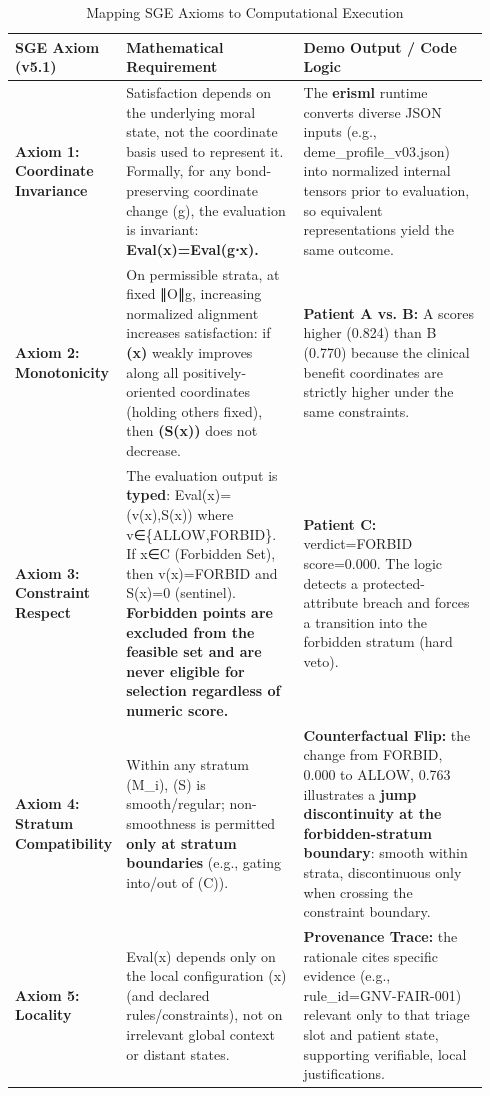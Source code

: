 \documentclass[12pt]{article}
\theoremstyle{plain}
\theoremstyle{definition}
\theoremstyle{remark}
\begin{document}
\begin{table}[t]
\centering
\caption{Mapping SGE Axioms to Computational Execution}
\begin{tabular}{p{0.13\linewidth} p{0.39\linewidth} p{0.42\linewidth}}
\toprule
\textbf{SGE Axiom (v5.1)} & \textbf{Mathematical Requirement} & \textbf{Demo Output / Code Logic} \\
\midrule
\textbf{Axiom 1: Coordinate Invariance} & Satisfaction depends on the
underlying moral state, not the coordinate basis used to represent it.
Formally, for any bond-preserving coordinate change (g), the evaluation
is invariant: \textbf{Eval(x)=Eval(g⋅x).} & The \textbf{erisml} runtime
converts diverse JSON inputs (e.g., deme\_profile\_v03.json) into
normalized internal tensors prior to evaluation, so equivalent
representations yield the same outcome. \\
\textbf{Axiom 2: Monotonicity} & On permissible strata, at fixed ∥O∥g,
increasing normalized alignment increases satisfaction: if \textbf{(x)}
weakly improves along all positively-oriented coordinates (holding
others fixed), then \textbf{(S(x))} does not decrease. & \textbf{Patient
A vs. B:} A scores higher (0.824) than B (0.770) because the clinical
benefit coordinates are strictly higher under the same constraints. \\
\textbf{Axiom 3: Constraint Respect} & The evaluation output is
\textbf{typed}: Eval(x)=(v(x),S(x)) where v∈\{ALLOW,FORBID\}. If x∈C
(Forbidden Set), then v(x)=FORBID and S(x)=0 (sentinel).
\textbf{Forbidden points are excluded from the feasible set and are
never eligible for selection regardless of numeric score.} &
\textbf{Patient C:} verdict=FORBID score=0.000. The logic detects a
protected-attribute breach and forces a transition into the forbidden
stratum (hard veto). \\
\textbf{Axiom 4: Stratum Compatibility} & Within any stratum (M\_i), (S)
is smooth/regular; non-smoothness is permitted \textbf{only at stratum
boundaries} (e.g., gating into/out of (C)). & \textbf{Counterfactual
Flip:} the change from FORBID, 0.000 to ALLOW, 0.763 illustrates a
\textbf{jump discontinuity at the forbidden-stratum boundary}: smooth
within strata, discontinuous only when crossing the constraint
boundary. \\
\textbf{Axiom 5: Locality} & Eval(x) depends only on the local
configuration (x) (and declared rules/constraints), not on irrelevant
global context or distant states. & \textbf{Provenance Trace:} the
rationale cites specific evidence (e.g., rule\_id=GNV-FAIR-001) relevant
only to that triage slot and patient state, supporting verifiable, local
justifications. \\
\bottomrule
\end{tabular}
\end{table}
\end{document}
